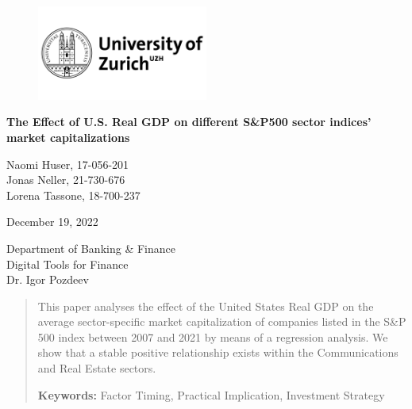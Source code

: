 \documentclass[a4paper,12pt]{article}
\begin{document}
	
	\begin{titlepage}
		\centering
		\begin{figure}[!h]
			\centering
			\includegraphics[width=0.5\textwidth]{UZH}
		\end{figure}
		\Large{\textbf{The Effect of U.S. Real
        GDP on different S\&P500 sector indices' market capitalizations}\\}

		\vfill
		\vfill
		\vfill
  
		
		\normalsize{Naomi Huser, 17-056-201 \\
                    Jonas Neller, 21-730-676 \\ 
				Lorena Tassone, 18-700-237
                }
		
		\vfill
			
		\normalsize{December 19, 2022}
		
		\vfill
		\vfill
	
		\normalsize{Department of Banking \& Finance \\ Digital Tools for Finance \\ Dr. Igor Pozdeev \\ }
	
		\vfill
        \begin{abstract}
            This paper analyses the effect of the United States Real GDP on the average sector-specific market capitalization of companies listed in the  S\&P 500 index between 2007 and 2021 by means of a regression analysis. We show that a stable positive relationship exists within the Communications and Real Estate sectors.
			
			\vspace{3mm}
			
			\textbf{Keywords:} Factor Timing, Practical Implication, Investment Strategy
		\end{abstract}
		
		
	\end{titlepage}
	


	\tableofcontents

	\clearpage
	\listoffigures
	
\end{document}
